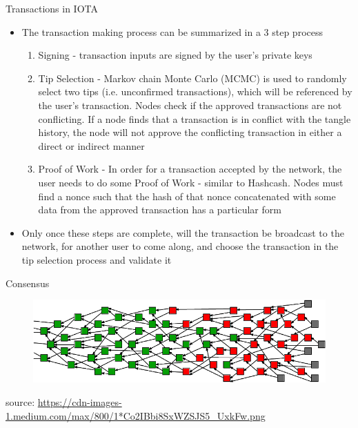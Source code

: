 \documentclass[9pt]{beamer}
\begin{document}

\begin{frame}{Transactions in IOTA}
	\begin{itemize}
		\item The transaction making process can be summarized in a 3 step process
		\begin{enumerate}
			\item Signing - transaction inputs are signed by the user's private keys
			\item Tip Selection - Markov chain Monte Carlo (MCMC) is used to randomly select two tips (i.e. unconfirmed transactions), which will be referenced by the user's transaction. Nodes check if the approved transactions are not conflicting. If a node finds that a transaction is in conflict with the tangle history, the node will not approve the conflicting transaction in either a direct or indirect manner
			\item Proof of Work - In order for a transaction accepted by the network, the user needs to do some Proof of Work - similar to Hashcash. Nodes must find a nonce such that the hash of that nonce concatenated with some data from the approved transaction has a particular form
		\end{enumerate}
		\item Only once these steps are complete, will the transaction be broadcast to the network, for another user to come along, and choose the transaction in the tip selection process and validate it
	\end{itemize}
\end{frame}


\begin{frame}{Consensus}
	\begin{figure}[]
		\centering
		\includegraphics  [scale=0.3]{Images/iota-consensus}
	\end{figure}
	\begin{scriptsize}
		source: \href{https://blog.iota.org/a-primer-on-iota-with-presentation-e0a6eb2cc621}{https://cdn-images-1.medium.com/max/800/1*Co2IBbi8SxWZSJS5\_UxkFw.png}
	\end{scriptsize}
\end{frame}
\end{document}

